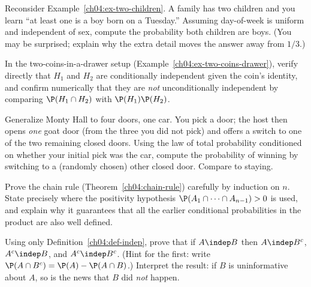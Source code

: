 \begin{exercise}
\label{ch04:exer-two-children}
Reconsider Example~\ref{ch04:ex-two-children}. A family has two children and you learn ``at least one is a boy born on a Tuesday.'' Assuming day-of-week is uniform and independent of sex, compute the probability both children are boys. (You may be surprised; explain why the extra detail moves the answer away from $1/3$.)
\end{exercise}

\begin{exercise}
\label{ch04:exer-cond-indep}
In the two-coins-in-a-drawer setup (Example~\ref{ch04:ex-two-coins-drawer}), verify directly that $H_1$ and $H_2$ are conditionally independent given the coin's identity, and confirm numerically that they are \emph{not} unconditionally independent by comparing $\P(H_1\cap H_2)$ with $\P(H_1)\P(H_2)$.
\end{exercise}

\begin{exercise}
\label{ch04:exer-monty4}
Generalize Monty Hall to four doors, one car. You pick a door; the host then opens \emph{one} goat door (from the three you did not pick) and offers a switch to one of the two remaining closed doors. Using the law of total probability conditioned on whether your initial pick was the car, compute the probability of winning by switching to a (randomly chosen) other closed door. Compare to staying.
\end{exercise}

\begin{exercise}
\label{ch04:exer-proof}
Prove the chain rule (Theorem~\ref{ch04:chain-rule}) carefully by induction on $n$. State precisely where the positivity hypothesis $\P(A_1\cap\cdots\cap A_{n-1}) > 0$ is used, and explain why it guarantees that all the earlier conditional probabilities in the product are also well defined.
\end{exercise}

\begin{exercise}
\label{ch04:exer-symmetry}
Using only Definition~\ref{ch04:def-indep}, prove that if $A \indep B$ then $A \indep B^c$, $A^c \indep B$, and $A^c \indep B^c$. (Hint for the first: write $\P(A\cap B^c) = \P(A) - \P(A\cap B)$.) Interpret the result: if $B$ is uninformative about $A$, so is the news that $B$ did \emph{not} happen.
\end{exercise}
